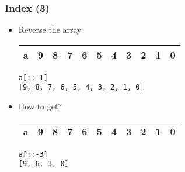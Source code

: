 \documentclass{beamer}
\begin{document}
\begin{frame}[fragile]
\frametitle{Index (3)}
\begin{itemize}
\item Reverse the array
\begin{table}[t]
\centering
\begin{tabular}{|l|c|c|c|c|c|c|c|c|c|c|}
\hline
a & 9 & 8 & 7 & 6 & 5 & 4 & 3 & 2 & 1 & 0 \\
\hline
\end{tabular}
\end{table}
\begin{lstlisting}
a[::-1]
[9, 8, 7, 6, 5, 4, 3, 2, 1, 0]
\end{lstlisting}

\item How to get?
\begin{table}[t]
\centering
\begin{tabular}{|l|c|c|c|c|c|c|c|c|c|c|}
\hline
a &\cellcolor{red} 9 & 8 & 7 &\cellcolor{red} 6 & 5 & 4 &\cellcolor{red} 3 & 2 & 1 &\cellcolor{red} 0 \\
\hline
\end{tabular}
\end{table}

\begin{lstlisting}
a[::-3]
[9, 6, 3, 0]
\end{lstlisting}

\end{itemize}
\end{frame}
\end{document}
